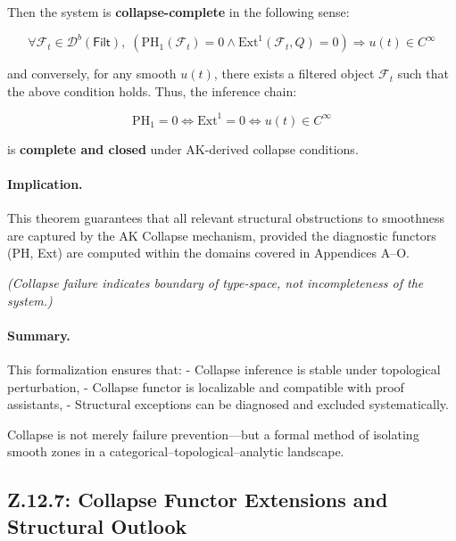\documentclass[11pt]{article}
\begin{document}
\begin{axiom}
\begin{axiom}
{{Then the system is \textbf{collapse-complete} in the following sense:

\[
\forall \mathcal{F}_t \in \mathcal{D}^b(\mathsf{Filt}),\;
\left( \mathrm{PH}_1(\mathcal{F}_t) = 0 \land \mathrm{Ext}^1(\mathcal{F}_t, Q) = 0 \right)
\Rightarrow u(t) \in C^\infty
\]

and conversely, for any smooth \( u(t) \), there exists a filtered object \( \mathcal{F}_t \) such that the above condition holds.  
Thus, the inference chain:

\[
\mathrm{PH}_1 = 0 \Leftrightarrow \mathrm{Ext}^1 = 0 \Leftrightarrow u(t) \in C^\infty
\]

is \textbf{complete and closed} under AK-derived collapse conditions.

\vspace{1em}
\paragraph{Implication.}

This theorem guarantees that all relevant structural obstructions to smoothness are captured by the AK Collapse mechanism,  
provided the diagnostic functors (PH, Ext) are computed within the domains covered in Appendices A–O.

\vspace{1em}
\textit{(Collapse failure indicates boundary of type-space, not incompleteness of the system.)}



\paragraph{Summary.}

This formalization ensures that:
- Collapse inference is stable under topological perturbation,
- Collapse functor is localizable and compatible with proof assistants,
- Structural exceptions can be diagnosed and excluded systematically.

Collapse is not merely failure prevention—but a formal method of isolating smooth zones in a categorical–topological–analytic landscape.



\subsection*{Z.12.7: Collapse Functor Extensions and Structural Outlook}

}}
\end{axiom}
\end{axiom}
\end{document}
